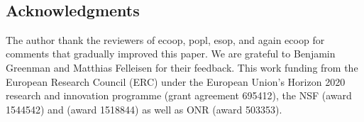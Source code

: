 \documentclass[USenglish]{tex/lipics-v2016}
\begin{document}
~\\

\subsection*{Acknowledgments} The author thank the reviewers of {\sc ecoop},
{\sc popl}, {\sc esop}, and again {\sc ecoop} for comments that gradually
improved this paper. We are grateful to Benjamin Greenman and Matthias
Felleisen for their feedback.  This work funding from the European Research
Council (ERC) under the European Union’s Horizon 2020 research and
innovation programme (grant agreement 695412), the NSF (award 1544542) and
(award 1518844) as well as ONR (award 503353).

\newpage



\end{document}
